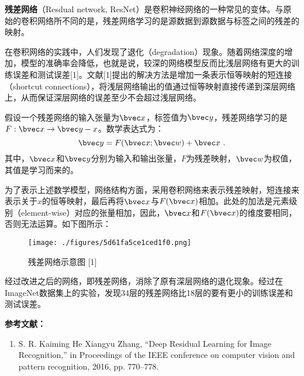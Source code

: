 


\textbf{残差网络}（Resdual network, ResNet）是卷积神经网络的一种常见的变体。与原始的卷积网络所不同的是，残差网络学习的是源数据到源数据与标签之间的残差的映射。

在卷积网络的实践中，人们发现了退化（degradation）现象。随着网络深度的增加，模型的准确率会降低，也就是说，较深的网络模型反而比浅层网络有更大的训练误差和测试误差[1]。文献[1]提出的解决方法是增加一条表示恒等映射的短连接（shortcut connections），将浅层网络输出的值通过恒等映射直接传递到深层网络上，从而保证深层网络的误差至少不会超过浅层网络。

假设一个残差网络的输入张量为$\bvec x$，标签值为$\bvec y$，残差网络学习的是$F: \bvec x \rightarrow \bvec y-x$。数学表达式为：
\begin{equation}
\bvec y=F(\bvec  x;\bvec  w)+\bvec x~.
\end{equation}
其中，$\bvec x$和$\bvec y$分别为输入和输出张量，$F$为残差映射，$\bvec w$为权值，其值是学习而来的。

为了表示上述数学模型，网络结构方面，采用卷积网络来表示残差映射，短连接来表示关于$x$的恒等映射，最后再将$\bvec x$与$F(\bvec x)$相加。此处的加法是元素级别（element-wise）对应的张量相加，因此，$\bvec x$和$F(\bvec x)$的维度要相同，否则无法运算。如下图所示：
\begin{figure}[ht]
\centering
\texttt{[image: ./figures/5d61fa5ce1ced1f0.png]}
\caption{残差网络示意图 [1]} \label{fig_ResNet}
\end{figure}

经过改进之后的网络，即残差网络，消除了原有深层网络的退化现象。经过在ImageNet数据集上的实验，发现34层的残差网络比18层的要有更小的训练误差和测试误差。


\textbf{参考文献：}
\begin{enumerate}
\item S. R. Kaiming He Xiangyu Zhang, “Deep Residual Learning for Image Recognition,” in Proceedings of the IEEE conference on computer vision and pattern recognition, 2016, pp. 770–778.
\end{enumerate}
